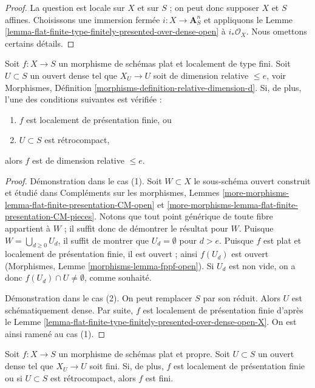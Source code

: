\begin{proof}
La question est locale sur $X$ et sur $S$ ; on peut donc supposer $X$ et
$S$ affines. Choisissons une immersion fermée $i : X \to \mathbf{A}^n_S$
et appliquons
le Lemme \ref{lemma-flat-finite-type-finitely-presented-over-dense-open}
à $i_*\mathcal{O}_X$. Nous omettons certains détails.
\end{proof}

\begin{lemma}
\label{lemma-flat-finite-presentation-dimension-over-dense-open}
Soit $f : X \to S$ un morphisme de schémas plat et localement
de type fini. Soit $U \subset S$ un ouvert dense tel que
$X_U \to U$ soit de dimension relative $\leq e$, voir
Morphismes, Définition \ref{morphisms-definition-relative-dimension-d}.
Si, de plus, l'une des conditions suivantes est vérifiée :
\begin{enumerate}
\item $f$ est localement de présentation finie, ou
\item $U \subset S$ est rétrocompact,
\end{enumerate}
alors $f$ est de dimension relative $\leq e$.
\end{lemma}

\begin{proof}
Démonstration dans le cas (1). Soit $W \subset X$ le sous-schéma ouvert construit
et étudié dans Compléments sur les morphismes, Lemmes
\ref{more-morphisms-lemma-flat-finite-presentation-CM-open} et
\ref{more-morphisms-lemma-flat-finite-presentation-CM-pieces}.
Notons que tout point générique de toute fibre appartient à $W$ ;
il suffit donc de démontrer le résultat pour $W$. Puisque
$W = \bigcup_{d \geq 0} U_d$, il suffit de montrer que $U_d = \emptyset$
pour $d > e$. Puisque $f$ est plat et localement de présentation finie, il est ouvert ;
ainsi $f(U_d)$ est ouvert (Morphismes, Lemme \ref{morphisms-lemma-fppf-open}).
Si $U_d$ est non vide, on a donc $f(U_d) \cap U \not = \emptyset$,
comme souhaité.

\medskip\noindent
Démonstration dans le cas (2). On peut remplacer $S$ par son réduit. Alors $U$ est
schématiquement dense. Par suite, $f$ est localement de présentation finie
d'après le Lemme \ref{lemma-flat-finite-type-finitely-presented-over-dense-open-X}.
On est ainsi ramené au cas (1).
\end{proof}

\begin{lemma}
\label{lemma-proper-flat-finite-over-dense-open}
Soit $f : X \to S$ un morphisme de schémas plat et propre.
Soit $U \subset S$ un ouvert dense tel que $X_U \to U$ soit fini.
Si, de plus, $f$ est localement de présentation finie ou si
$U \subset S$ est rétrocompact, alors $f$ est fini.
\end{lemma}

